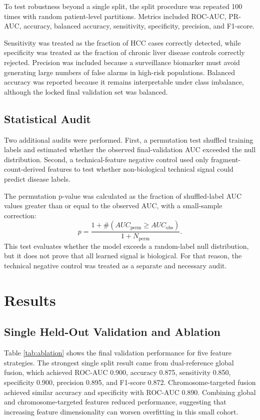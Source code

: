 \documentclass[conference]{IEEEtran}
\begin{document}
To test robustness beyond a single split, the split procedure was repeated 100 times with random patient-level partitions. Metrics included ROC-AUC, PR-AUC, accuracy, balanced accuracy, sensitivity, specificity, precision, and F1-score.

Sensitivity was treated as the fraction of HCC cases correctly detected, while specificity was treated as the fraction of chronic liver disease controls correctly rejected. Precision was included because a surveillance biomarker must avoid generating large numbers of false alarms in high-risk populations. Balanced accuracy was reported because it remains interpretable under class imbalance, although the locked final validation set was balanced.

\subsection{Statistical Audit}
Two additional audits were performed. First, a permutation test shuffled training labels and estimated whether the observed final-validation AUC exceeded the null distribution. Second, a technical-feature negative control used only fragment-count-derived features to test whether non-biological technical signal could predict disease labels.

The permutation p-value was calculated as the fraction of shuffled-label AUC values greater than or equal to the observed AUC, with a small-sample correction:
\begin{equation}
    p = \frac{1 + \#(AUC_{\mathrm{perm}} \geq AUC_{\mathrm{obs}})}{1 + N_{\mathrm{perm}}}.
\end{equation}
This test evaluates whether the model exceeds a random-label null distribution, but it does not prove that all learned signal is biological. For that reason, the technical negative control was treated as a separate and necessary audit.

\section{Results}
\subsection{Single Held-Out Validation and Ablation}
Table \ref{tab:ablation} shows the final validation performance for five feature strategies. The strongest single split result came from dual-reference global fusion, which achieved ROC-AUC 0.900, accuracy 0.875, sensitivity 0.850, specificity 0.900, precision 0.895, and F1-score 0.872. Chromosome-targeted fusion achieved similar accuracy and specificity with ROC-AUC 0.890. Combining global and chromosome-targeted features reduced performance, suggesting that increasing feature dimensionality can worsen overfitting in this small cohort.
\end{document}
